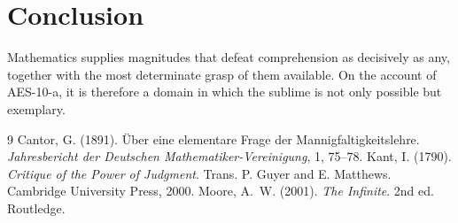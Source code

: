 \documentclass{situationist-preprint}
\begin{document}
\section{Conclusion}

Mathematics supplies magnitudes that defeat comprehension as decisively as any, together with the most determinate grasp of them available. On the account of AES-10-a, it is therefore a domain in which the sublime is not only possible but exemplary.

\begin{thebibliography}{9}\small
{} Cantor, G. (1891). \"Uber eine elementare Frage der Mannigfaltigkeitslehre. \emph{Jahresbericht der Deutschen Mathematiker-Vereinigung}, 1, 75--78.
 Kant, I. (1790). \emph{Critique of the Power of Judgment}. Trans. P. Guyer and E. Matthews. Cambridge University Press, 2000.
 Moore, A.~W. (2001). \emph{The Infinite}. 2nd ed. Routledge.
\end{thebibliography}
\end{document}
